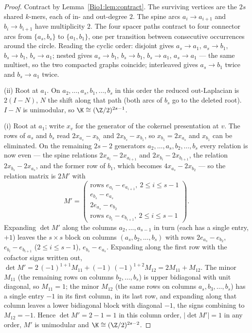 \begin{proof}
Contract by Lemma~\ref{Bio1:lem:contract}. The surviving vertices are the $2s$ shared $k$-mers,
each of in- and out-degree $2$. The spine arcs $a_i\to a_{i+1}$ and $b_i\to b_{i+1}$ have
multiplicity $2$. The four spacer paths contract to four connector arcs from
$\{a_s,b_s\}$ to $\{a_1,b_1\}$, one per transition between consecutive occurrences around
the circle. Reading the cyclic order: disjoint gives $a_s\!\to\!a_1$, $a_s\!\to\!b_1$,
$b_s\!\to\!b_1$, $b_s\!\to\!a_1$; nested gives $a_s\!\to\!b_1$, $b_s\!\to\!b_1$,
$b_s\!\to\!a_1$, $a_s\!\to\!a_1$ --- the same multiset, so the two compacted graphs
coincide; interleaved gives $a_s\!\to\!b_1$ twice and $b_s\!\to\!a_1$ twice.

(ii) Root at $a_1$. On $a_2,\dots,a_s,b_1,\dots,b_s$ in this order the reduced out-Laplacian
is $2(I-N)$, $N$ the shift along that path (both arcs of $b_s$ go to the deleted root).
$I-N$ is unimodular, so $\K\cong(\Z/2)^{2s-1}$.

(i) Root at $a_1$; write $x_v$ for the generator of the cokernel presentation at $v$. The
rows of $a_s$ and $b_s$ read $2x_{a_s}-x_{b_1}$ and $2x_{b_s}-x_{b_1}$, so $x_{b_1}=2x_{a_s}$
and $x_{b_1}$ can be eliminated. On the remaining $2s-2$ generators
$a_2,\dots,a_s,b_2,\dots,b_s$ every relation is now even --- the spine relations
$2x_{a_i}-2x_{a_{i+1}}$ and $2x_{b_i}-2x_{b_{i+1}}$, the relation $2x_{b_s}-2x_{a_s}$, and the
former row of $b_1$, which becomes $4x_{a_s}-2x_{b_2}$ --- so the relation matrix is $2M'$
with
\[
M'=\begin{pmatrix}
\text{rows } e_{a_i}-e_{a_{i+1}},\ 2\le i\le s-1\\
e_{b_s}-e_{a_s}\\
2e_{a_s}-e_{b_2}\\
\text{rows } e_{b_i}-e_{b_{i+1}},\ 2\le i\le s-1
\end{pmatrix}.
\]
Expanding $\det M'$ along the columns $a_2,\dots,a_{s-1}$ in turn (each has a single entry,
$+1$) leaves the $s\times s$ block on columns $(a_s,b_2,\dots,b_s)$ with rows
$2e_{a_s}-e_{b_2}$, $e_{b_i}-e_{b_{i+1}}$ ($2\le i\le s-1$), $e_{b_s}-e_{a_s}$.
Expanding along the first row with the cofactor signs written out,
$\det M'=2\,(-1)^{1+1}M_{11}+(-1)\,(-1)^{1+2}M_{12}=2M_{11}+M_{12}$. The minor $M_{11}$ (the
remaining rows on columns $b_2,\dots,b_s$) is upper bidiagonal with unit diagonal, so
$M_{11}=1$; the minor $M_{12}$ (the same rows on columns $a_s,b_3,\dots,b_s$) has a single
entry $-1$ in its first column, in its last row, and expanding along that column leaves a
lower bidiagonal block with diagonal $-1$, the signs combining to $M_{12}=-1$. Hence
$\det M'=2-1=1$ in this column order, $|\det M'|=1$ in any order, $M'$ is unimodular and
$\K\cong(\Z/2)^{2s-2}$.
\end{proof}

